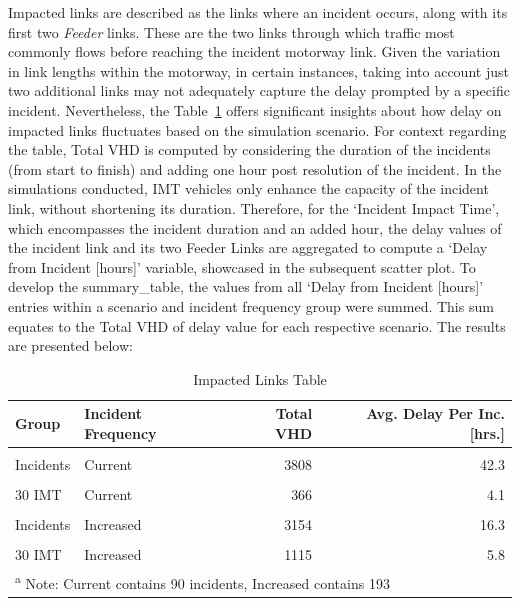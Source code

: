 \documentclass[fancy, oneside, mastersfancy, ms]{byuthesis}
\begin{document}
Impacted links are described as the links where an incident occurs,
along with its first two \emph{Feeder} links. These are the two links
through which traffic most commonly flows before reaching the incident
motorway link. Given the variation in link lengths within the motorway,
in certain instances, taking into account just two additional links may
not adequately capture the delay prompted by a specific incident.
Nevertheless, the Table~\ref{tbl-impacted_links} offers significant
insights about how delay on impacted links fluctuates based on the
simulation scenario. For context regarding the table, Total VHD is
computed by considering the duration of the incidents (from start to
finish) and adding one hour post resolution of the incident. In the
simulations conducted, IMT vehicles only enhance the capacity of the
incident link, without shortening its duration. Therefore, for the
`Incident Impact Time', which encompasses the incident duration and an
added hour, the delay values of the incident link and its two Feeder
Links are aggregated to compute a `Delay from Incident {[}hours{]}'
variable, showcased in the subsequent scatter plot. To develop the
summary\_table, the values from all `Delay from Incident {[}hours{]}'
entries within a scenario and incident frequency group were summed. This
sum equates to the Total VHD of delay value for each respective
scenario. The results are presented below:

\hypertarget{tbl-impacted_links}{}
\begin{table}
\caption{\label{tbl-impacted_links}Impacted Links Table }\tabularnewline

\centering
\begin{tabular}[t]{llrr}
\toprule
\textbf{Group} & \textbf{Incident Frequency} & \textbf{Total VHD} & \textbf{Avg. Delay Per Inc. [hrs.]}\\
\midrule
\cellcolor{gray!6}{Baseline} & \cellcolor{gray!6}{Current} & \cellcolor{gray!6}{326} & \cellcolor{gray!6}{3.6}\\
Incidents & Current & 3808 & 42.3\\
\cellcolor{gray!6}{20 IMT} & \cellcolor{gray!6}{Current} & \cellcolor{gray!6}{723} & \cellcolor{gray!6}{8.0}\\
30 IMT & Current & 366 & 4.1\\
\cellcolor{gray!6}{Baseline} & \cellcolor{gray!6}{Increased} & \cellcolor{gray!6}{540} & \cellcolor{gray!6}{2.8}\\
\addlinespace
Incidents & Increased & 3154 & 16.3\\
\cellcolor{gray!6}{20 IMT} & \cellcolor{gray!6}{Increased} & \cellcolor{gray!6}{1645} & \cellcolor{gray!6}{8.5}\\
30 IMT & Increased & 1115 & 5.8\\
\bottomrule
\multicolumn{4}{l}{\textsuperscript{a} Note: Current contains 90 incidents, Increased contains 193}\\
\end{tabular}
\end{table}
\end{document}
